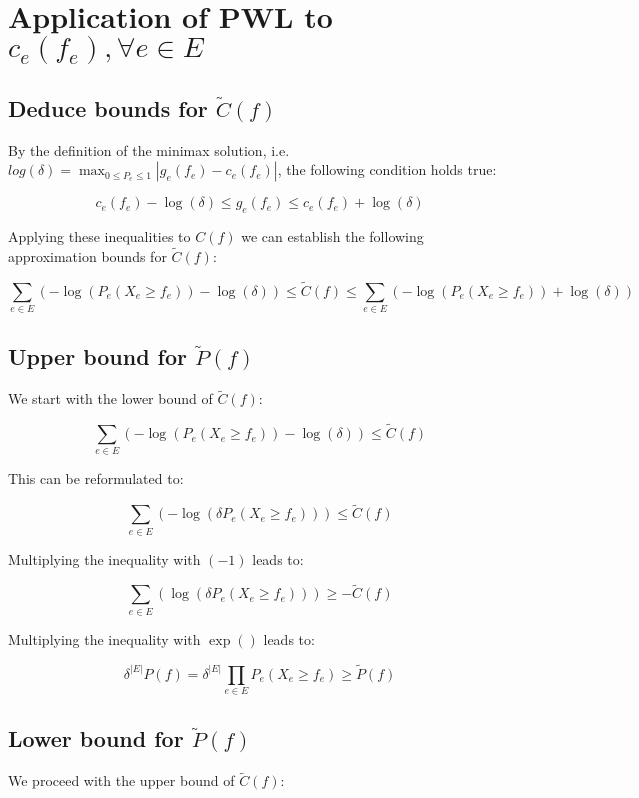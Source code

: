 \documentclass[10pt]{article}
\begin{document}
\section{Application of PWL to $c_e(f_e), \forall e \in E$}

\subsection{Deduce bounds for $\tilde{C}(f)$}

By the definition of the minimax solution, i.e. $log\left(\delta\right)=\max_{0\leq P_e\leq 1}|g_e(f_e)-c_e(f_e)|$, the following condition holds true:

\[c_e(f_e) - \log(\delta) \leq g_e(f_e) \leq c_e(f_e) + \log(\delta)\]

Applying these inequalities to $C(f)$ we can establish the following approximation bounds for $\tilde{C}(f)$:

\[\sum_{e\in E}\left(-\log\left(P_e(X_e \geq f_e)\right) - \log(\delta)\right) \leq \tilde{C}(f) \leq \sum_{e\in E}\left(-\log\left(P_e(X_e \geq f_e)\right) + \log(\delta)\right)\]

\subsection{Upper bound for $\tilde{P}(f)$}

We start with the lower bound of $\tilde{C}(f)$:

\[\sum_{e\in E}\left(-\log\left(P_e(X_e \geq f_e)\right) - \log(\delta)\right) \leq \tilde{C}(f) \]

This can be reformulated to:

\[\sum_{e\in E}\left(-\log\left(\delta P_e(X_e \geq f_e)\right) \right) \leq \tilde{C}(f) \]

Multiplying the inequality with $(-1)$ leads to:

\[\sum_{e\in E}\left(\log\left(\delta P_e(X_e \geq f_e)\right) \right) \geq -\tilde{C}(f) \]

Multiplying the inequality with $\exp()$ leads to:

\[\delta^{|E|}P(f)=\delta^{|E|}\prod_{e\in E}P_e\left(X_{e} \geq f_e\right) \geq \tilde{P}(f) \]

\subsection{Lower bound for $\tilde{P}(f)$}

We proceed with the upper bound of $\tilde{C}(f)$:
\end{document}
